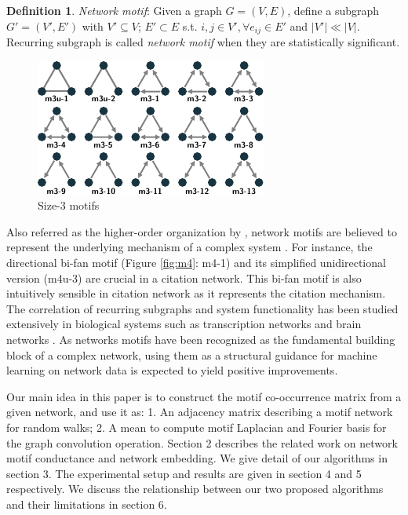 \documentclass{article}
\theoremstyle{definition}
\newtheorem{definition}{Definition}[section]
\begin{document}
\begin{definition}{\emph{Network motif}}:
Given a graph $G = (V,E)$, define a subgraph $G' = (V', E')$ with $V'
\subseteq V$;
$E' \subset E$ s.t. $i,j \in V', \forall e_{ij} \in E'$ and $|V'| \ll |V|$.
Recurring subgraph is called \emph{network motif} when they are
statistically significant.
\end{definition}

\begin{figure}
    \centering
    \includegraphics[width=0.8\linewidth]{m3}
    \setlength{\belowcaptionskip}{-1em}
    \caption{Size-3 motifs}
    \label{fig:m3}
\end{figure}

Also referred as the higher-order organization by \citeauthor{juremotif},
network motifs are believed to represent the underlying mechanism of a
complex system
\cite{netmotif,mangan2003structure}.
For instance, the directional bi-fan motif (Figure \ref{fig:m4}: m4-1)
and its simplified unidirectional version (m4u-3) are crucial in a citation
network. This bi-fan motif is also intuitively sensible in citation network
as it represents the citation mechanism.
The correlation of recurring subgraphs and system
functionality has been studied extensively in biological systems such as
transcription networks \cite{mangan2003structure} and brain
networks \cite{brainnetheuvel,honey2007network}. As networks motifs
have been recognized as the fundamental building block of a complex
network, using them as a structural guidance for machine learning
on network data is expected to yield positive improvements.

Our main idea in this paper is to construct the motif co-occurrence matrix
from a given network, and use it as: 1. An adjacency matrix describing a
motif network for random walks; 2. A mean to compute motif Laplacian and
Fourier basis for the graph convolution operation. Section 2 describes the
related work on network motif conductance and network embedding. We give
detail of our algorithms in section 3. The experimental setup and results
are given in section 4 and 5 respectively. We discuss the relationship
between our two proposed algorithms and their limitations in section 6.
\end{document}
